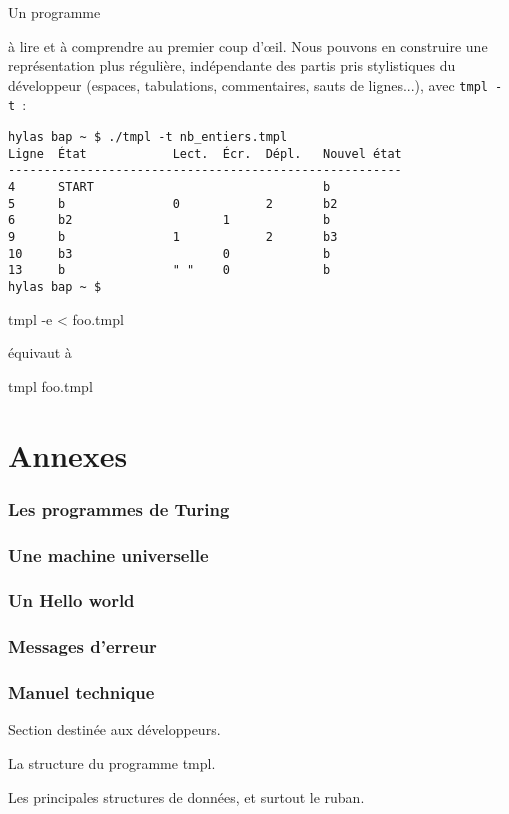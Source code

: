 \documentclass[a4paper, 11pt]{report}
\begin{document}
Un programme

 à lire et à
comprendre au premier coup d'œil. Nous pouvons en construire une
représentation plus régulière, indépendante des partis pris stylistiques
du développeur (espaces, tabulations, commentaires, sauts de lignes...),
avec \texttt{tmpl~-t}~:

\begin{verbatim}
hylas bap ~ $ ./tmpl -t nb_entiers.tmpl
Ligne  État            Lect.  Écr.  Dépl.   Nouvel état
-------------------------------------------------------
4      START                                b
5      b               0            2       b2
6      b2                     1             b
9      b               1            2       b3
10     b3                     0             b
13     b               " "    0             b
hylas bap ~ $
\end{verbatim}


tmpl -e < foo.tmpl

équivaut à

tmpl foo.tmpl


\part{Annexes}

\section{Les programmes de Turing}

\section{Une machine universelle}

\section{Un Hello world}

\section{Messages d'erreur}

\section{Manuel technique}

Section destinée aux développeurs. 

La structure du programme tmpl.

Les principales structures de données, et surtout le ruban.
\end{document}
